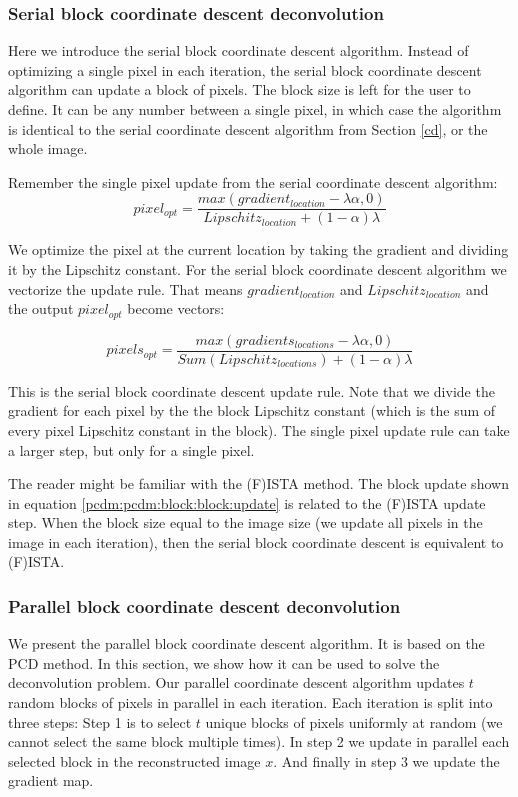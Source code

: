 \subsubsection{Serial block coordinate descent deconvolution}
Here we introduce the serial block coordinate descent algorithm. Instead of optimizing a single pixel in each iteration, the serial block coordinate descent algorithm can update a block of pixels. The block size is left for the user to define. It can be any number between a single pixel, in which case the algorithm is identical to the serial coordinate descent algorithm from Section \ref{cd}, or the whole image.

Remember the single pixel update from the serial coordinate descent algorithm: 
\begin{equation} \label{pcdm:pcdm:block:single:update}
pixel_{opt} = \frac{max(gradient_{location} - \lambda\alpha, 0)}{Lipschitz_{location} + (1 - \alpha)\lambda}
\end{equation}

We optimize the pixel at the current location by taking the gradient and dividing it by the Lipschitz constant. For the serial block coordinate descent algorithm we vectorize the update rule. That means $gradient_{location}$ and $Lipschitz_{location}$ and the output $pixel_{opt}$ become vectors:

\begin{equation} \label{pcdm:pcdm:block:block:update}
pixels_{opt} = \frac{max(gradients_{locations} - \lambda\alpha, 0)}{Sum(Lipschitz_{locations}) + (1 - \alpha)\lambda}
\end{equation}

This is the serial block coordinate descent update rule. Note that we divide the gradient for each pixel by the the block Lipschitz constant (which is the sum of every pixel Lipschitz constant in the block). The single pixel update rule can take a larger step, but only for a single pixel. 

The reader might be familiar with the (F)ISTA method\cite{beck2009fista}. The block update shown in equation \eqref{pcdm:pcdm:block:block:update} is related to the (F)ISTA update step. When the block size equal to the image size (we update all pixels in the image in each iteration), then the serial block coordinate descent is equivalent to (F)ISTA.


\subsubsection{Parallel block coordinate descent deconvolution}
We present the parallel block coordinate descent algorithm. It is based on the PCD method\cite{richtarik2016parallel}. In this section, we show how it can be used to solve the deconvolution problem. Our parallel coordinate descent algorithm updates $t$ random blocks of pixels in parallel in each iteration. Each iteration is split into three steps: Step 1 is to select $t$ unique blocks of pixels uniformly at random (we cannot select the same block multiple times). In step 2 we update in parallel each selected block in the reconstructed image $x$. And finally in step 3 we update the gradient map.

